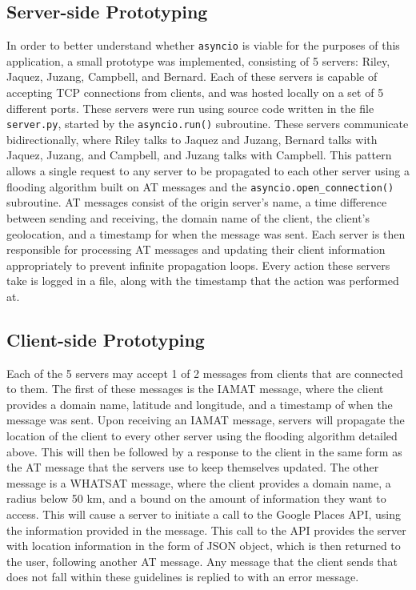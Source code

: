 \subsection{Server-side Prototyping}
\par
In order to better understand whether \texttt{asyncio} is viable for the
purposes of this application, a small prototype was implemented, consisting of 5
servers: Riley, Jaquez, Juzang, Campbell, and Bernard. Each of these servers is
capable of accepting TCP connections from clients, and was hosted locally on
a set of 5 different ports. These servers were run using source code written in
the file \texttt{server.py}, started by the \texttt{asyncio.run()} subroutine.
These servers communicate bidirectionally, where Riley talks to Jaquez and
Juzang, Bernard talks with Jaquez, Juzang, and Campbell, and Juzang talks with
Campbell. This pattern allows a single request to any server to be propagated to
each other server using a flooding algorithm built on AT messages and the
\texttt{asyncio.open\_connection()} subroutine. AT messages consist of the
origin server's name, a time difference between sending and receiving, the
domain name of the client, the client's geolocation, and a timestamp for when
the message was sent. Each server is then responsible for processing AT
messages and updating their client information appropriately to prevent
infinite propagation loops. Every action these servers take is logged in a file,
along with the timestamp that the action was performed at.

\subsection{Client-side Prototyping}
\par
Each of the 5 servers may accept 1 of 2 messages from clients that are connected
to them. The first of these messages is the IAMAT message, where the client 
provides a domain name, latitude and longitude, and a timestamp of when the
message was sent. Upon receiving an IAMAT message, servers will propagate the
location of the client to every other server using the flooding algorithm
detailed above. This will then be followed by a response to the client in the
same form as the AT message that the servers use to keep themselves updated.
The other message is a WHATSAT message, where the client provides a domain name,
a radius below 50 km, and a bound on the amount of information they want to 
access. This will cause a server to initiate a call to the Google Places API,
using the information provided in the message. This call to the API provides
the server with location information in the form of JSON object, which is then
returned to the user, following another AT message. Any message that the client
sends that does not fall within these guidelines is replied to with an error
message.

